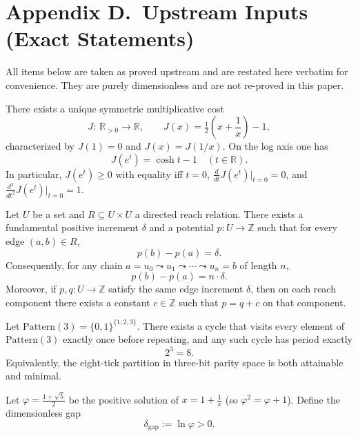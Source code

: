 \documentclass[11pt]{article}
\begin{document}
\section*{Appendix D.\ Upstream Inputs (Exact Statements)}

All items below are taken as proved upstream and are restated here verbatim for convenience. They are purely dimensionless and are not re-proved in this paper.

\begin{theorem}
There exists a unique symmetric multiplicative cost
\[
J:\ \mathbb{R}_{>0}\to\mathbb{R},\qquad
J(x)=\tfrac12\!\left(x+\frac{1}{x}\right)-1,
\]
characterized by \(J(1)=0\) and \(J(x)=J(1/x)\). On the log axis one has
\[
J(e^{t})=\cosh t-1\quad(t\in\mathbb{R}).
\]
In particular, \(J(e^{t})\ge 0\) with equality iff \(t=0\), \(\frac{d}{dt}J(e^{t})\big|_{t=0}=0\), and \(\frac{d^{2}}{dt^{2}}J(e^{t})\big|_{t=0}=1\).
\end{theorem}

\begin{theorem}
Let \(U\) be a set and \(R\subseteq U\times U\) a directed reach relation. There exists a fundamental positive increment \(\delta\) and a potential \(p:U\to\mathbb{Z}\) such that for every edge \((a,b)\in R\),
\[
p(b)-p(a)=\delta.
\]
Consequently, for any chain \(a=u_{0}\leadsto u_{1}\leadsto\cdots\leadsto u_{n}=b\) of length \(n\),
\[
p(b)-p(a)=n\cdot\delta.
\]
Moreover, if \(p,q:U\to\mathbb{Z}\) satisfy the same edge increment \(\delta\), then on each reach component there exists a constant \(c\in\mathbb{Z}\) such that \(p=q+c\) on that component.
\end{theorem}

\begin{theorem}[UP-3: Minimal parity cycle in \(D=3\)]
Let \(\mathrm{Pattern}(3)=\{0,1\}^{\{1,2,3\}}\). There exists a cycle that visits every element of \(\mathrm{Pattern}(3)\) exactly once before repeating, and any such cycle has period exactly
\[
2^{3}=8.
\]
Equivalently, the eight-tick partition in three-bit parity space is both attainable and minimal.
\end{theorem}

\begin{theorem}
Let \(\varphi=\tfrac{1+\sqrt{5}}{2}\) be the positive solution of \(x=1+\tfrac{1}{x}\) (so \(\varphi^{2}=\varphi+1\)). Define the dimensionless gap
\[
\delta_{\mathrm{gap}}:=\ln\varphi>0.
\]
\end{theorem}
\end{document}
